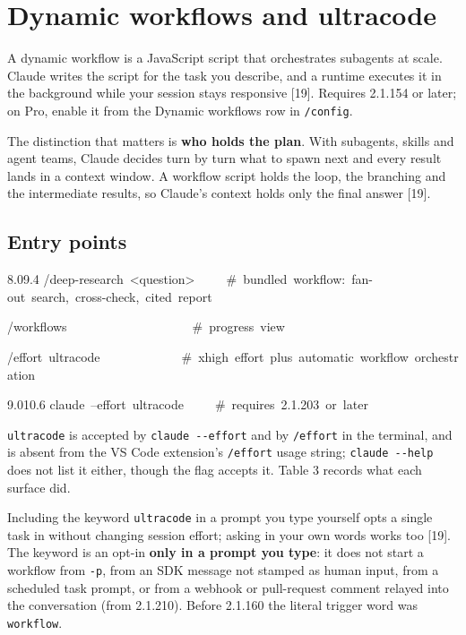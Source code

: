 \documentclass[11pt,a4paper,twoside,openany]{book}
\newcommand{\chaptertitlelabel}{}
\newcommand{\cl}[1]{\noindent\mbox{#1}\par}
\begin{document}
\FloatBarrier
\renewcommand{\chaptertitlelabel}{Part V \textperiodcentered\ Chapter 22}
\setcounter{chapter}{21}
\chapter{Dynamic workflows and ultracode}

A dynamic workflow is a JavaScript script that orchestrates subagents at scale. Claude writes the script for the task you describe, and a runtime executes it in the background while your session stays responsive [19]. Requires 2.1.154 or later; on Pro, enable it from the Dynamic workflows row in \texttt{/\allowbreak{}config}.


The distinction that matters is \textbf{who holds the plan}. With subagents, skills and agent teams, Claude decides turn by turn what to spawn next and every result lands in a context window. A workflow script holds the loop, the branching and the intermediate results, so Claude's context holds only the final answer [19].


\FloatBarrier
\setcounter{section}{0}
\section{Entry points}

\begin{codeblock}{8.0}{9.4}
\cl{/deep-research~<question>~~~~~\#~bundled~workflow:~fan-out~search,~cross-check,~cited~report}
\cl{/workflows~~~~~~~~~~~~~~~~~~~~\#~progress~view}
\cl{/effort~ultracode~~~~~~~~~~~~~\#~xhigh~effort~plus~automatic~workflow~orchestration}
\end{codeblock}

\begin{codeblock}{9.0}{10.6}
\cl{claude~--effort~ultracode~~~~~\#~requires~2.1.203~or~later}
\end{codeblock}

\texttt{ultracode} is accepted by \texttt{claude -\allowbreak{}-\allowbreak{}effort} and by \texttt{/\allowbreak{}effort} in the terminal, and is absent from the VS Code extension's \texttt{/\allowbreak{}effort} usage string; \texttt{claude -\allowbreak{}-\allowbreak{}help} does not list it either, though the flag accepts it. Table 3 records what each surface did.


Including the keyword \texttt{ultracode} in a prompt you type yourself opts a single task in without changing session effort; asking in your own words works too [19]. The keyword is an opt-in \textbf{only in a prompt you type}: it does not start a workflow from \texttt{-\allowbreak{}p}, from an SDK message not stamped as human input, from a scheduled task prompt, or from a webhook or pull-request comment relayed into the conversation (from 2.1.210). Before 2.1.160 the literal trigger word was \texttt{workflow}.
\end{document}
